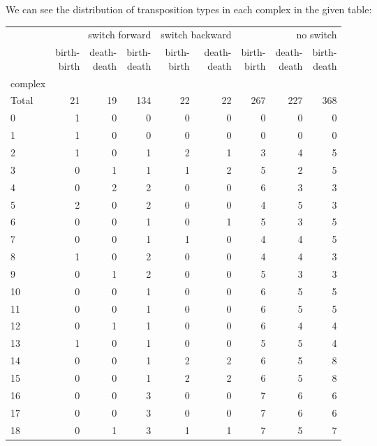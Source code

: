 \documentclass{article}
\begin{document}
\par We can see the distribution of transposition types in each complex in the given table:
\begin{center}
\begin{tabular}{lrrrrrrrr}
\toprule
& \multicolumn{3}{r}{switch forward} & \multicolumn{2}{r}{switch backward} & \multicolumn{3}{r}{no switch} \\
& \makecell{birth-\\birth} & \makecell{death-\\death} & \makecell{birth-\\death} & \makecell{birth-\\birth} & \makecell{death-\\death} & \makecell{birth-\\birth} & \makecell{death-\\death} & \makecell{birth-\\death} \\
complex &  &  &  &  &  &  &  &  \\
\midrule
Total & 21 & 19 & 134 & 22 & 22 & 267 & 227 & 368 \\
0 & 1 & 0 & 0 & 0 & 0 & 0 & 0 & 0 \\
1 & 1 & 0 & 0 & 0 & 0 & 0 & 0 & 0 \\
2 & 1 & 0 & 1 & 2 & 1 & 3 & 4 & 5 \\
3 & 0 & 1 & 1 & 1 & 2 & 5 & 2 & 5 \\
4 & 0 & 2 & 2 & 0 & 0 & 6 & 3 & 3 \\
5 & 2 & 0 & 2 & 0 & 0 & 4 & 5 & 3 \\
6 & 0 & 0 & 1 & 0 & 1 & 5 & 3 & 5 \\
7 & 0 & 0 & 1 & 1 & 0 & 4 & 4 & 5 \\
8 & 1 & 0 & 2 & 0 & 0 & 4 & 4 & 3 \\
9 & 0 & 1 & 2 & 0 & 0 & 5 & 3 & 3 \\
10 & 0 & 0 & 1 & 0 & 0 & 6 & 5 & 5 \\
11 & 0 & 0 & 1 & 0 & 0 & 6 & 5 & 5 \\
12 & 0 & 1 & 1 & 0 & 0 & 6 & 4 & 4 \\
13 & 1 & 0 & 1 & 0 & 0 & 5 & 5 & 4 \\
14 & 0 & 0 & 1 & 2 & 2 & 6 & 5 & 8 \\
15 & 0 & 0 & 1 & 2 & 2 & 6 & 5 & 8 \\
16 & 0 & 0 & 3 & 0 & 0 & 7 & 6 & 6 \\
17 & 0 & 0 & 3 & 0 & 0 & 7 & 6 & 6 \\
18 & 0 & 1 & 3 & 1 & 1 & 7 & 5 & 7 \\

\end{tabular}
\end{center}
\end{document}
